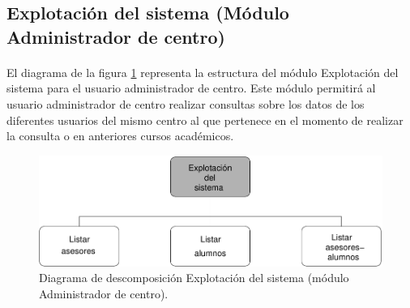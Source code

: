 \subsection{Explotación del sistema (Módulo Administrador de centro)}

  \paragraph{}El diagrama de la figura
  \ref{diagramaDescomposicionExplotacionSistema-admCentro} representa la
  estructura del módulo Explotación del sistema para el usuario administrador
  de centro. Este módulo permitirá al usuario administrador de centro realizar
  consultas sobre los datos de los diferentes usuarios del mismo centro
  al que pertenece en el momento de realizar la consulta o en anteriores cursos
  académicos.

  \begin{figure}[!ht]
    \begin{center}
      \includegraphics[]{11.Disenyo_Arquitectonico/11.2.Diagramas_Descomposicion/11.2.3.Modulo_administrador_centro/ExplotacionSistema/Diagramas/explotacion_sistema.pdf}
      \caption{Diagrama de descomposición Explotación del sistema (módulo Administrador de centro).}
      \label{diagramaDescomposicionExplotacionSistema-admCentro}
    \end{center}
  \end{figure}